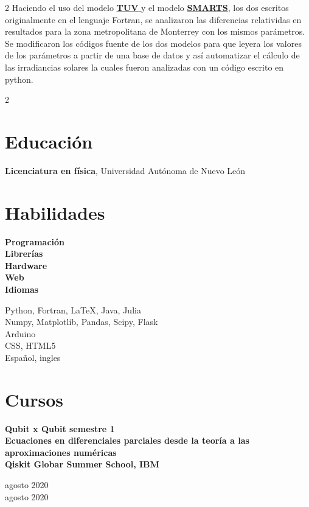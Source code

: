 \documentclass[a3paper,15pt]{adcv}
\newcommand*{\tuv}{\href{https://www2.acom.ucar.edu/modeling/tropospheric-ultraviolet-and-visible-tuv-radiation-model}{\textbf{TUV }}}
\begin{document}
\begin{multicols}{2}
  Haciendo el uso del modelo \tuv y el
  modelo \href{https://www.nrel.gov/grid/solar-resource/smarts.html}{\textbf{SMARTS}}, los dos escritos originalmente en el lenguaje Fortran, se analizaron las diferencias relatividas en
  resultados para la zona metropolitana de Monterrey con los mismos parámetros. Se modificaron los códigos fuente de los dos modelos para que leyera los valores de los parámetros 
  a partir de una base de datos y así automatizar el cálculo de las irradiancias solares la cuales fueron analizadas con un código escrito en python.
  \end{multicols}
  \begin{multicols}{2}
\section{Educación}

\textbf{Licenciatura en física}, Universidad Autónoma de Nuevo León

\section{Habilidades}

\begin{minipage}{0.25\linewidth}
  \begin{flushright}
    \textbf{Programación}\\
    \textbf{Librerías}\\
    \textbf{Hardware}\\
    \textbf{Web}\\
    \textbf{Idiomas}
  \end{flushright}
\end{minipage}
\hspace{0.3cm}
\begin{minipage}{0.75\linewidth}
  \vspace{0.25cm}
  Python, Fortran, LaTeX, Java, Julia\\
  Numpy, Matplotlib, Pandas, Scipy, Flask\\
  Arduino\\
  CSS, HTML5\\
  Español, ingles
\end{minipage}


\section{Cursos}

\begin{minipage}{0.7\linewidth}
  \textbf{Qubit x Qubit semestre 1}\\
  \textbf{Ecuaciones en diferenciales parciales desde la teoría a las aproximaciones numéricas}\\
  \textbf{Qiskit Globar Summer School, IBM}
\end{minipage}
\begin{minipage}{0.3\linewidth}
  \begin{flushright}
  agosto 2020\\
  agosto 2020\vspace{1cm}\\


\end{flushright}
\end{minipage}
\end{multicols}
\end{document}
